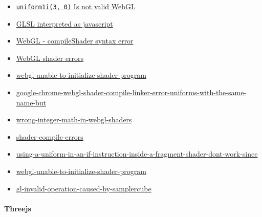 \documentclass[]{article}
\begin{document}
\begin{itemize}
\itemsep1pt\parskip0pt
\item
  \href{http://stackoverflow.com/questions/20821486/how-to-debug-webgl-uncaught-type-error}{\texttt{uniform1i(3, 0)}
  Is not valid WebGL}
\item
  \href{http://stackoverflow.com/questions/31690465/webgl-shaders-uncaught-syntax-error}{GLSL
  interpreted as javascript}
\item
  \href{http://stackoverflow.com/questions/18500831/webgl-compileshader-syntax-error}{WebGL
  - compileShader syntax error}
\item
  \href{http://stackoverflow.com/questions/11216912/webgl-shader-errors}{WebGL
  shader errors}
\item
  \href{http://stackoverflow.com/questions/23724507/webgl-unable-to-initialize-shader-program}{webgl-unable-to-initialize-shader-program}
\item
  \href{http://stackoverflow.com/questions/20084865/google-chrome-webgl-shader-compile-linker-error-uniforms-with-the-same-name-but}{google-chrome-webgl-shader-compile-linker-error-uniforms-with-the-same-name-but}
\item
  \href{http://stackoverflow.com/questions/31520908/wrong-integer-math-in-webgl-shaders}{wrong-integer-math-in-webgl-shaders}
\item
  \href{http://stackoverflow.com/questions/12755044/shader-compile-errors}{shader-compile-errors}
\item
  \href{http://stackoverflow.com/questions/18815502/using-a-uniform-in-an-if-instruction-inside-a-fragment-shader-dont-work-since}{using-a-uniform-in-an-if-instruction-inside-a-fragment-shader-dont-work-since}
\item
  \href{http://stackoverflow.com/questions/23724507/webgl-unable-to-initialize-shader-program/23740067\#23740067}{webgl-unable-to-initialize-shader-program}
\item
  \href{http://stackoverflow.com/questions/31665132/gl-invalid-operation-caused-by-samplercube}{gl-invalid-operation-caused-by-samplercube}
\end{itemize}

\paragraph{Threejs}\label{threejs}
\end{document}
